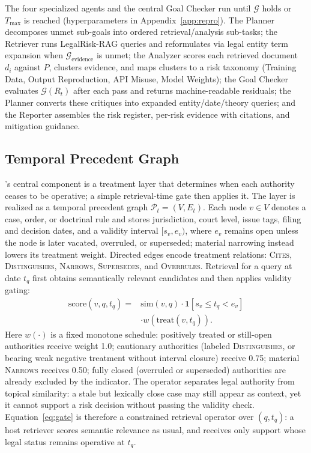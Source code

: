 The four specialized agents and the central Goal Checker run until $\mathcal{G}$ holds or $T_{\max}$ is reached (hyperparameters in Appendix~\ref{app:repro}).
The Planner decomposes unmet sub-goals into ordered retrieval/analysis sub-tasks; the Retriever runs LegalRisk-RAG queries and reformulates via legal entity term expansion when $\mathcal{G}_{\mathrm{evidence}}$ is unmet; the Analyzer scores each retrieved document $d_i$ against $P$, clusters evidence, and maps clusters to a risk taxonomy (Training Data, Output Reproduction, API Misuse, Model Weights); the Goal Checker evaluates $\mathcal{G}(R_t)$ after each pass and returns machine-readable residuals; the Planner converts these critiques into expanded entity/date/theory queries; and the Reporter assembles the risk register, per-risk evidence with citations, and mitigation guidance.

\subsection{Temporal Precedent Graph}
\label{sec:temporal}

\sysname{}'s central component is a treatment layer that determines when each authority ceases to be operative; a simple retrieval-time gate then applies it.
The layer is realized as a temporal precedent graph $\mathcal{P}_t = (V, E_t)$.
Each node $v \in V$ denotes a case, order, or doctrinal rule and stores jurisdiction, court level, issue tags, filing and decision dates, and a validity interval $[s_v, e_v)$, where $e_v$ remains open unless the node is later vacated, overruled, or superseded; material narrowing instead lowers its treatment weight.
Directed edges encode treatment relations: \textsc{Cites}, \textsc{Distinguishes}, \textsc{Narrows}, \textsc{Supersedes}, and \textsc{Overrules}.
Retrieval for a query at date $t_q$ first obtains semantically relevant candidates and then applies validity gating:
\begin{equation}
\label{eq:gate}
\begin{aligned}
\mathrm{score}(v, q, t_q) ={}& \mathrm{sim}(v, q) \cdot \mathbf{1}[s_v \le t_q < e_v] \\
&\cdot w(\mathrm{treat}(v, t_q)).
\end{aligned}
\end{equation}
Here $w(\cdot)$ is a fixed monotone schedule: positively treated or still-open authorities receive weight 1.0; cautionary authorities (labeled \textsc{Distinguishes}, or bearing weak negative treatment without interval closure) receive 0.75; material \textsc{Narrows} receives 0.50; fully closed (overruled or superseded) authorities are already excluded by the indicator.
The operator separates legal authority from topical similarity: a stale but lexically close case may still appear as context, yet it cannot support a risk decision without passing the validity check.
Equation~\eqref{eq:gate} is therefore a constrained retrieval operator over $(q, t_q)$: a host retriever scores semantic relevance as usual, and \plre{} receives only support whose legal status remains operative at $t_q$.

